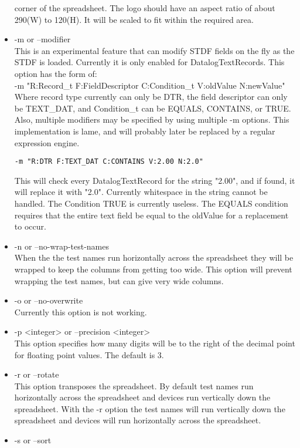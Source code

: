 \documentclass[letterpaper]{article}
\begin{document}
\begin{itemize}
corner of the spreadsheet.  The logo should have an aspect ratio of
about 290(W) to 120(H).  It will be scaled to fit within the required area.
\item -m or --modifier\\
This is an experimental feature that can modify STDF fields on the fly as the STDF is loaded.
Currently it is only enabled for DatalogTextRecords. This option has the form of:\\
-m "R:Record\_t F:FieldDescriptor C:Condition\_t V:oldValue N:newValue"\\
Where record type currently can only be DTR, the field descriptor can only be TEXT\_DAT, and
Condition\_t can be EQUALS, CONTAINS, or TRUE.  Also, multiple modifiers may be specified by using multiple -m options.
This implementation is lame, and will probably later be replaced by a regular expression engine.\\
\begin{verbatim}
-m "R:DTR F:TEXT_DAT C:CONTAINS V:2.00 N:2.0"
\end{verbatim}
This will check every DatalogTextRecord for the string "2.00", and
if found, it will replace it with "2.0".  Currently whitespace in the
string cannot be handled.  The Condition TRUE is currently useless. The EQUALS
condition requires that the entire text field be equal to the oldValue for
a replacement to occur.
\item -n or --no-wrap-test-names\\
When the the test names run horizontally across the spreadsheet they will be wrapped
to keep the columns from getting too wide.  This option will prevent wrapping the test
names, but can give very wide columns.
\item -o or --no-overwrite\\
Currently this option is not working.
\item -p <integer> or --precision <integer>\\
This option specifies how many digits will be to the right of the decimal
point for floating point values.  The default is 3.
\item -r or --rotate\\
This option transposes the spreadsheet.  By default test names run horizontally across
the spreadsheet and devices run vertically down the spreadsheet. With the -r option
the test names will run vertically down the spreadsheet and devices will run horizontally
across the spreadsheet.
\item -s or --sort\\

\end{itemize}
\end{document}
